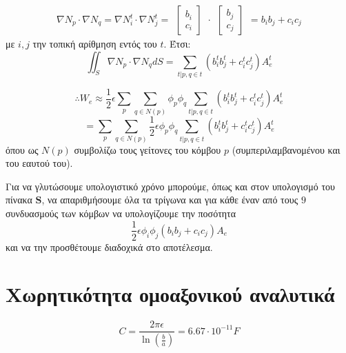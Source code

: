 \documentclass[10pt, letterpaper]{article}
\begin{document}
\[ \nabla N_p  \cdot \nabla N_q  = \nabla N_i^t \cdot \nabla N_j^t = 
    \begin{align} 
        \begin{bmatrix}
        b_i \\
        c_i
        \end{bmatrix}
    \end{align}  \cdot \begin{align} 
        \begin{bmatrix}
        b_j \\
        c_j        \end{bmatrix}
    \end{align}  =  b_ib_j + c_ic_j
\]
με $i,j$ την τοπική αρίθμηση εντός του $t$. Έτσι:
\[ \iint_S \nabla N_p  \cdot \nabla N_q  dS = \sum_{t | p,q \in t} (b_i^tb_j^t + c_i^tc_j^t) A_e^t  \]

\[ \therefore W_e \approx \frac{1}{2} \epsilon  \sum_p \sum_{q \in N(p)}  \phi_p \phi_q   \sum_{t | p,q \in t} (b_i^tb_j^t + c_i^tc_j^t) A_e^t  \]
\[ =   \sum_p \sum_{q \in N(p)} \frac{1}{2} \epsilon  \phi_p \phi_q   \sum_{t | p,q \in t} (b_i^tb_j^t + c_i^tc_j^t) A_e^t   \]
όπου ως $N(p)$ συμβολίζω τους γείτονες του κόμβου $p$ (συμπεριλαμβανομένου και του εαυτού του).

Για να γλυτώσουμε υπολογιστικό χρόνο μπορούμε, όπως και στον υπολογισμό του πίνακα $\mathbf{S}$, να απαριθμήσουμε όλα τα 
τρίγωνα και για κάθε έναν από τους $9$ συνδυασμούς των κόμβων να υπολογίζουμε την ποσότητα 
\[ \frac{1}{2} \epsilon  \phi_i \phi_j  (b_ib_j + c_ic_j) A_e   \]
και να την προσθέτουμε διαδοχικά στο αποτέλεσμα. 


\section*{Χωρητικότητα ομοαξονικού αναλυτικά }
\[ C = \frac{2 \pi \epsilon}{\ln (\frac{b}{a})} =  6.67 \cdot 10^{-11} F\]
\end{document}
